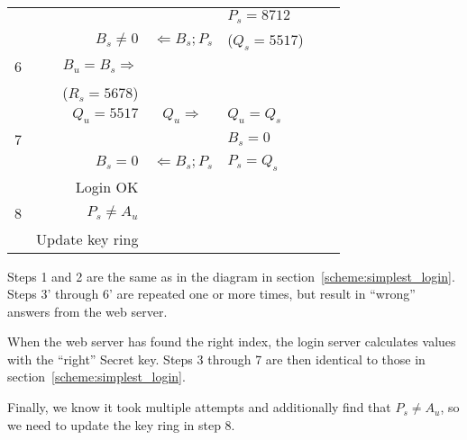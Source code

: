\begin{table}[H]
\begin{tabular}{|l|r|c|l|c|l|}
  & & & $P_s=8712$ & & \\
  & $B_s\neq0$ & $\Longleftarrow B_s ; P_s $ & ($Q_s=5517$) & & \\
\hline
6 & $B_u=B_s\Rightarrow$ & & & & \\
  & ($R_s=5678$) & & & & \\
  & $Q_u=5517$ & $Q_u \Longrightarrow$ & $Q_u=Q_s$ & & \\
\hline
\hline
7 & & & $B_s=0$ & & \\
  & $B_s=0$ & $\Longleftarrow B_s ; P_s$ & $P_s=Q_s$ & & \\
  & Login OK & & & & \\
\hline
8 & $P_s\neq A_u$ &  & & & \\
  & Update key ring & & & & \\
\hline
\end{tabular}
\end{table}
\par
Steps 1 and 2 are the same as in the diagram in section~\vref{scheme:simplest_login}.
Steps 3' through 6' are repeated one or more times, but result in ``wrong'' answers from the web server.
\par
When the web server has found the right index,
the login server calculates values with the ``right'' Secret key.
Steps 3 through 7 are then identical to those in section~\vref{scheme:simplest_login}.
\par
Finally,
we know it took multiple attempts and additionally find that $P_s\neq A_u$,
so we need to update the key ring in step 8.
